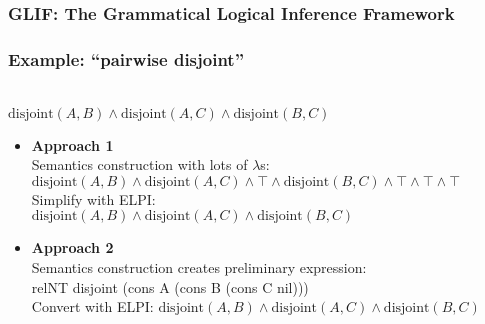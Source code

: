 \documentclass[aspectratio=169]{beamer}
\begin{document}


\begin{frame}
    \frametitle{GLIF: The Grammatical Logical Inference Framework}
    \centering
    

    \vspace{1.5em}
\end{frame}

% 


\begin{frame}
    \frametitle{Example: ``pairwise disjoint''}
    \newcommand\ds{\text{disjoint}}
    \\
    {\color{logicfont} $\ds(A,B) \wedge \ds(A,C) \wedge \ds(B,C)$}
    \vspace{1em}

    \begin{itemize}
        \item \textbf{Approach 1}\\Semantics construction with lots of $\lambda$s:
            {\hspace{2em}\color{logicfont} $\ds(A,B) \wedge \ds(A,C) \wedge \top \wedge \ds(B,C) \wedge \top \wedge \top\wedge\top$}\\
                Simplify with ELPI:\\
            {\hspace{2em}\color{logicfont} $\ds(A,B) \wedge \ds(A,C) \wedge \ds(B,C)$}
        \pause
        \item \textbf{Approach 2}\\Semantics construction creates preliminary expression:\\
            {\hspace{2em}\color{logicfont}\ttfamily relNT disjoint (cons A (cons B (cons C nil))) }\\
                Convert with ELPI:
            {\hspace{2em}\color{logicfont} $\ds(A,B) \wedge \ds(A,C) \wedge \ds(B,C)$}
    \end{itemize}
\end{frame}
\end{document}
